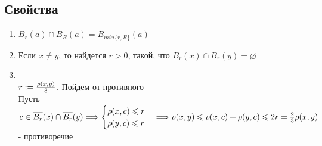 \documentclass[12pt,letterpaper]{report}
\makeatletter
\theoremstyle{definition}
\renewenvironment{proof}[1][\proofname]{%
   \par\pushQED{\qed}\normalfont%
   \topsep6\p@\@plus6\p@\relax
   \trivlist\item[\hskip\labelsep\bfseries#1\@addpunct{.}]%
   \ignorespaces
}{%
   \popQED\endtrivlist\@endpefalse
}
\makeatother
\begin{document}
    \subsection*{Свойства}
    \begin{enumerate}
        \item $B_r(a) \cap B_R(a) = B_{min\{r, R\}}(a)$
        \item Если $x \neq y$, то найдется $r > 0$, такой, что 
        $\overline{B_r}(x) \cap \overline{B_r}(y) = \varnothing$
        \begin{proof}
            \quad \\
            $r := {{\rho(x, y)}\over{3}}$. Пойдем от противного \\
            Пусть $c \in \overline{B_r}(x) \cap \overline{B_r}(y) \Longrightarrow
            \begin{cases}
                \rho(x, c) \leqslant r \\
                \rho(y, c) \leqslant r
            \end{cases} \Longrightarrow \rho(x, y) \leqslant \rho(x, c) + \rho(y, c) 
            \leqslant 2r = {{2}\over{3}}\rho(x, y)$ - противоречие
        \end{proof}
    \end{enumerate}
\end{document}
